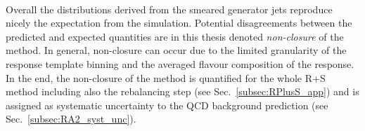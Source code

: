 \begin{description}
\begin{figure}[!t]
  \label{fig:qcd_rs_genjets}
\end{figure}
\\
Overall the distributions derived from the smeared generator jets reproduce nicely the expectation from the simulation. Potential disagreements between the predicted and expected quantities are in this thesis denoted \textit{non-closure} of the method. In general, non-closure can occur due to the limited granularity of the response template binning and the averaged flavour composition of the response. In the end, the non-closure of the method is quantified for the whole R+S method including also the rebalancing step (see Sec.~\ref{subsec:RPlusS_app}) and is assigned as systematic uncertainty to the QCD background prediction (see Sec.~\ref{subsec:RA2_syst_unc}). 
\end{description}
\begin{figure}[!t]
  \centering


\end{figure}
